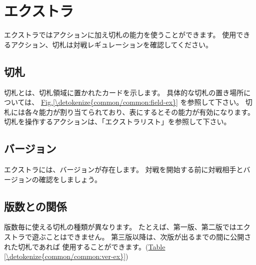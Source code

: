 \documentclass[letterpaper,10pt,dvipdfmx]{sphinxmanual}
\begin{document}
\section{エクストラ}
\label{\detokenize{common/common:extra}}\label{\detokenize{common/common:id33}}
\sphinxAtStartPar
エクストラではアクションに加え切札の能力を使うことができます。
使用できるアクション、切札は対戦レギュレーションを確認してください。


\subsection{切札}
\label{\detokenize{common/common:id34}}
\sphinxAtStartPar
切札とは、切札領域に置かれたカードを示します。
具体的な切札の置き場所については、 \hyperref[\detokenize{common/common:field-ex}]{Fig.\@ \ref{\detokenize{common/common:field-ex}}} を参照して下さい。
切札には各々能力が割り当てられており、表にするとその能力が有効になります。
切札を操作するアクションは、「エクストラリスト」を参照して下さい。


\subsection{バージョン}
\label{\detokenize{common/common:id35}}
\sphinxAtStartPar
エクストラには、バージョンが存在します。
対戦を開始する前に対戦相手とバージョンの確認をしましょう。


\subsection{版数との関係}
\label{\detokenize{common/common:id36}}
\sphinxAtStartPar
版数毎に使える切札の種類が異なります。
たとえば、第一版、第二版ではエクストラで遊ぶことはできません。
第三版以降は、次版が出るまでの間に公開された切札であれば
使用することができます。(\hyperref[\detokenize{common/common:ver-ex}]{Table \ref{\detokenize{common/common:ver-ex}}})
\end{document}
